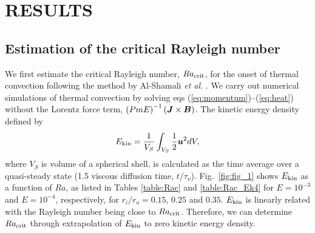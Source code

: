 \section{RESULTS}

\subsection{Estimation of the critical Rayleigh number}

%
{\color{red}
We first estimate the critical Rayleigh number, $Ra_{\rm crit}$, for the onset of thermal convection following the method by Al-Shamali {\it et al.} .
We carry out numerical simulations of thermal convection by solving eqs (\ref{eq:momentum})--(\ref{eq:heat}) without the Lorentz force term, $\left(Pm E\right)^{-1} \left(\mbox{\boldmath$J$} \times \mbox{\boldmath$B$} \right)$.
The kinetic energy density defined by
%
\begin{equation}
E_{\rm kin} = \frac{1}{V_{S}} \int_{V_{S}} \frac{1}{2} \mbox{\boldmath$u$}^{2} dV,
\label{eq:kinetic_energy}
\end{equation}
%
where $V_{S}$ is volume of a spherical shell, is calculated as the time average over a quasi-steady state (1.5 viscous diffusion time, $t/\tau_\nu$).
Fig.~\ref{fig:fig_1} shows $E_{\rm kin}$ as a function of $Ra$, as listed in Tables \ref{table:Rac} and \ref{table:Rac_Ek4} for $E = 10^{-3}$ and $E = 10^{-4}$, respectively, for $r_i / r_o = 0.15$, $0.25$ and $0.35$.
$E_{\rm kin}$ is linearly related with the Rayleigh number being close to $Ra_{\rm crit}$.
Therefore, we can determine $Ra_{\rm crit}$ through extrapolation of $E_{\rm kin}$ to zero kinetic energy density.
}
